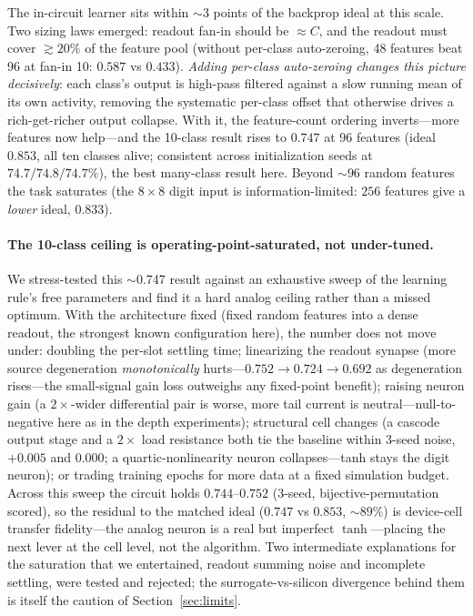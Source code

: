\documentclass[11pt]{article}
\begin{document}
The in-circuit learner sits within $\sim$3 points of the backprop ideal at this scale. Two sizing laws emerged: readout fan-in should be $\approx C$, and the readout must cover $\gtrsim 20\%$ of the feature pool (without per-class auto-zeroing, 48 features beat 96 at fan-in 10: $0.587$ vs $0.433$). \emph{Adding per-class auto-zeroing changes this picture decisively}: each class's output is high-pass filtered against a slow running mean of its own activity, removing the systematic per-class offset that otherwise drives a rich-get-richer output collapse. With it, the feature-count ordering inverts---more features now help---and the 10-class result rises to $\mathbf{0.747}$ at 96 features (ideal $0.853$, all ten classes alive; consistent across initialization seeds at $74.7/74.8/74.7\%$), the best many-class result here. Beyond ${\sim}96$ random features the task saturates (the $8{\times}8$ digit input is information-limited: $256$ features give a \emph{lower} ideal, $0.833$).

\paragraph{The 10-class ceiling is operating-point-saturated, not under-tuned.} We stress-tested this $\sim$0.747 result against an exhaustive sweep of the learning rule's free parameters and find it a hard analog ceiling rather than a missed optimum. With the architecture fixed (fixed random features into a dense readout, the strongest known configuration here), the number does not move under: doubling the per-slot settling time; linearizing the readout synapse (more source degeneration \emph{monotonically} hurts---$0.752\!\to\!0.724\!\to\!0.692$ as degeneration rises---the small-signal gain loss outweighs any fixed-point benefit); raising neuron gain (a $2\times$-wider differential pair is worse, more tail current is neutral---null-to-negative here as in the depth experiments); structural cell changes (a cascode output stage and a $2\times$ load resistance both tie the baseline within 3-seed noise, $+0.005$ and $0.000$; a quartic-nonlinearity neuron collapses---tanh stays the digit neuron); or trading training epochs for more data at a fixed simulation budget. Across this sweep the circuit holds $0.744$--$0.752$ (3-seed, bijective-permutation scored), so the residual to the matched ideal ($0.747$ vs $0.853$, ${\sim}89\%$) is device-cell transfer fidelity---the analog neuron is a real but imperfect $\tanh$---placing the next lever at the cell level, not the algorithm. Two intermediate explanations for the saturation that we entertained, readout summing noise and incomplete settling, were tested and rejected; the surrogate-vs-silicon divergence behind them is itself the caution of Section~\ref{sec:limits}.
\end{document}
